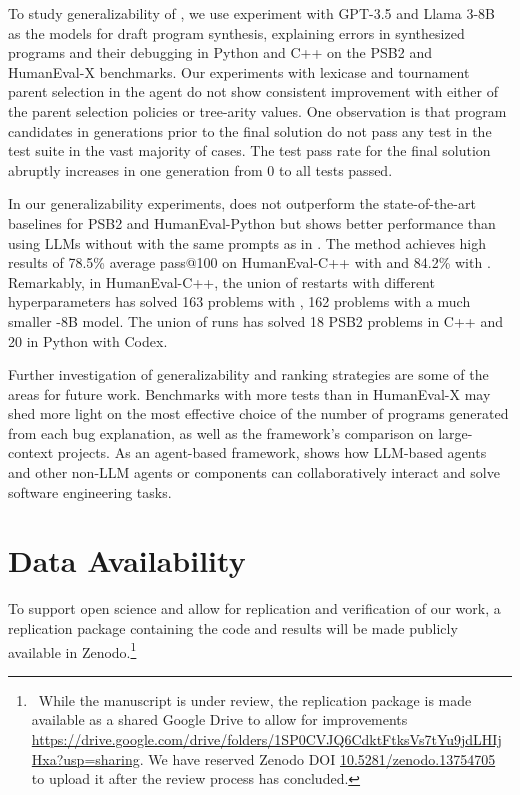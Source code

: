 To study generalizability of \method{}, we use experiment with GPT-3.5 and Llama 3-8B as the models for draft program synthesis, explaining errors in synthesized programs and their debugging in Python and C++ on the PSB2 and HumanEval-X benchmarks. 
Our experiments with lexicase and tournament parent selection in the \rank{} agent do not show consistent improvement with either of the parent selection policies or tree-arity values. 
One observation is that program candidates in generations prior to the final solution do not pass any test in the test suite in the vast majority of cases. 
The test pass rate for the final solution abruptly increases in one generation from 0 to all tests passed. 

In our generalizability experiments, \method{} does not outperform the state-of-the-art baselines for PSB2 and HumanEval-Python but shows better performance than using LLMs without \method{} with the same prompts as in \method{}.
The method achieves high results of 78.5\% average pass@100 on HumanEval-C++ with \gpt{} and 84.2\% with \llama{}.
Remarkably, in HumanEval-C++, the union of \method{} restarts with different hyperparameters has solved 163 problems with \gpt{}, 162 problems with a much smaller \llama{}-8B model.
The union of \method{} runs has solved 18 PSB2 problems in C++ and 20 in Python with Codex. 

Further investigation of \method{} generalizability and ranking strategies are some of the areas for future work. 
Benchmarks with more tests than in HumanEval-X may shed more light on the most effective choice of the number of programs generated from each bug explanation, as well as the framework's comparison on large-context projects. 
As an agent-based framework, \method{} shows how LLM-based agents and other non-LLM agents or components can collaboratively interact and solve software engineering tasks.

\section*{Data Availability}
To support open science and allow for replication and verification of our work, a replication package containing the code and results will be made publicly available in Zenodo.\footnote{~While the manuscript is under review, the replication package is made available as a shared Google Drive to allow for improvements \url{https://drive.google.com/drive/folders/1SP0CVJQ6CdktFtksVs7tYu9jdLHIjHxa?usp=sharing}. We have reserved Zenodo DOI \href{https://doi.org/10.5281/zenodo.13754705}{10.5281/zenodo.13754705} to upload it after the review process has concluded.
}
